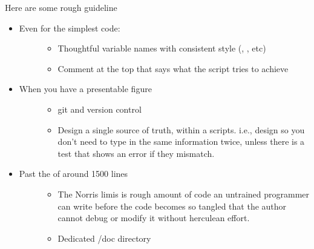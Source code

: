 \documentclass[letterpaper,10pt,english]{sphinxmanual}
\begin{document}
\sphinxAtStartPar
Here are some rough guideline
\begin{itemize}
\item {} \begin{description}
\item[{Even for the simplest code:}] \leavevmode\begin{itemize}
\item {} 
\sphinxAtStartPar
Thoughtful variable names with consistent style (, , etc)

\item {} 
\sphinxAtStartPar
Comment at the top that says what the script tries to achieve

\end{itemize}

\end{description}

\item {} \begin{description}
\item[{When you have a presentable figure}] \leavevmode\begin{itemize}
\item {} 
\sphinxAtStartPar
git and version control

\item {} 
\sphinxAtStartPar
Design a single source of truth, within a scripts. i.e., design so you don’t need to type in the same information twice, unless there is a test that shows an error if they mismatch.

\end{itemize}

\end{description}

\item {} \begin{description}
\item[{Past the  of around 1500 lines}] \leavevmode\begin{itemize}
\item {} 
\sphinxAtStartPar
The Norris limis is rough amount of code an untrained programmer can write before the code becomes so tangled that the author cannot debug or modify it without herculean effort.

\item {} 
\sphinxAtStartPar
Dedicated /doc directory


\end{itemize}
\end{description}
\end{itemize}
\end{document}
